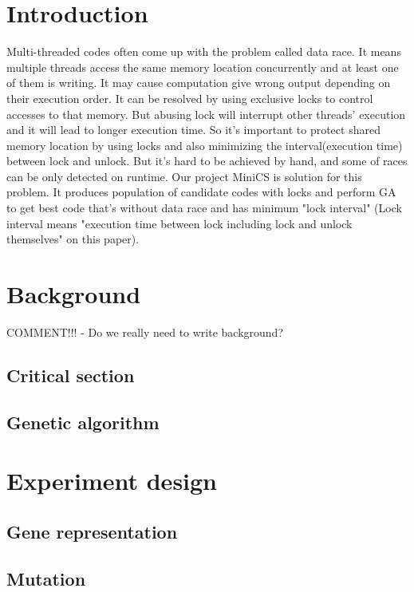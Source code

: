 \documentclass[sigconf]{acmart}
\begin{document}
\section{Introduction}
Multi-threaded codes often come up with the problem called data race. It means multiple threads access the same memory location concurrently and at least one of them is writing. It may cause computation give wrong output depending on their execution order. It can be resolved by using exclusive locks to control accesses to that memory. But abusing lock will interrupt other threads' execution and it will lead to longer execution time.
So it's important to protect shared memory location by using locks and also minimizing the interval(execution time) between lock and unlock. But it's hard to be achieved by hand, and some of races can be only detected on runtime.
Our project MiniCS is solution for this problem. It produces population of candidate codes with locks and perform GA to get best code that's without data race and has minimum "lock interval" (Lock interval means "execution time between lock including lock and unlock themselves" on this paper).

\section{Background}
COMMENT!!! - Do we really need to write background?
\subsection{Critical section}

\subsection{Genetic algorithm}

\section{Experiment design}

\subsection{Gene representation}



\subsection{Mutation}
\end{document}
